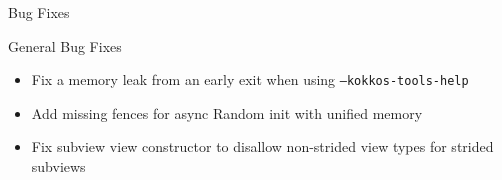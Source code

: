 
\begin{frame}[fragile]

  {\Huge Bug Fixes}

  \vspace{10pt}

\end{frame}





%        



\begin{frame}[fragile]{General Bug Fixes}
    \begin{itemize}
      \item Fix a memory leak from an early exit when using \texttt{--kokkos-tools-help} %
      \item Add missing fences for async Random init with unified memory %
      \item Fix subview view constructor to disallow non-strided view types for strided subviews %
    \end{itemize}
\end{frame}

